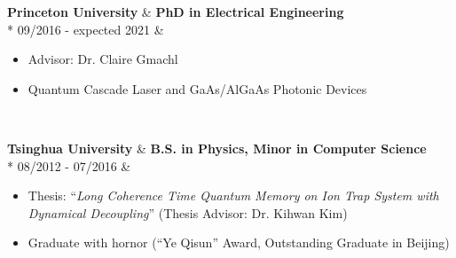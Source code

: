 %
%
%

\newcommand\scholarshipentry[4]{
   \textbf{#1} & \textbf{#2} \\*
   #3          & \begin{minipage}[t]{\rightcolumnlength}
                     #4
                 \end{minipage}	\\}


\begin{experience}
	\scholarshipentry{Princeton University}{PhD in Electrical Engineering}
	{09/2016 - expected 2021}{
		\begin{itemize}
			\item Advisor: Dr. Claire Gmachl
			\item Quantum Cascade Laser and GaAs/AlGaAs Photonic Devices
		\end{itemize}
	}
	\emptySeparator
	\scholarshipentry{Tsinghua University}{B.S. in Physics, 
	Minor in Computer Science}
	{08/2012 - 07/2016}{
		\begin{itemize}
			\item Thesis: ``\emph{Long Coherence Time Quantum Memory on 
				Ion Trap System with Dynamical Decoupling}''
				(Thesis Advisor: Dr. Kihwan Kim)
			\item Graduate with hornor (``Ye Qisun'' Award,
				Outstanding Graduate in Beijing)
		\end{itemize} 
	}
\end{experience}
